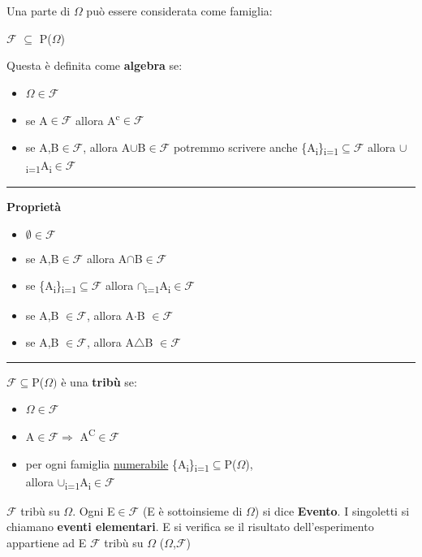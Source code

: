 \documentclass[12pt, a4paper]{article}
\def\SPSB#1#2{\rlap{\textsuperscript{#1}}\SB{#2}}
\def\SP#1{\textsuperscript{#1}}
\def\SB#1{\textsubscript{#1}}
\def\separator{\begin{center}    \rule{100pt}{0.5pt}\end{center}}
\begin{document}
Una parte di $\Omega$ può essere considerata come famiglia:
\begin{center}
    $\mathcal{F}$ $\subseteq$ P($\Omega$)
\end{center}
Questa è definita come \textbf{algebra} se:
\begin{itemize}
    \item $\Omega\in\mathcal{F}$
    \item se A$\in\mathcal{F}$ allora A\SP{c}$\in\mathcal{F}$
    \item se A,B$\in\mathcal{F}$, allora A$\cup$B$\in\mathcal{F}$
    \subitem potremmo scrivere anche \{A\SB{i}\}\SPSB{n}{i=1}$\subseteq\mathcal{F}$ allora 
    $\cup$\SPSB{n}{i=1}A\SB{i}$\in\mathcal{F}$
\end{itemize}

\separator

\large{\textbf{Proprietà}}\normalsize
\begin{itemize}
    \item $\emptyset\in\mathcal{F}$
    \item se A,B$\in\mathcal{F}$ allora A$\cap$B$\in\mathcal{F}$
    \item se \{A\SB{i}\}\SPSB{n}{i=1}$\subseteq\mathcal{F}$ allora $\cap$\SPSB{n}{i=1}A\SB{i}$\in\mathcal{F}$
    \item se A,B $\in\mathcal{F}$, allora A$\cdot$B $\in\mathcal{F}$
    \item se A,B $\in\mathcal{F}$, allora A$\triangle$B $\in\mathcal{F}$
\end{itemize}

\separator
 
$\mathcal{F}\subseteq$P($\Omega)$ è una \textbf{tribù} se:
\begin{itemize}
    \item $\Omega\in\mathcal{F}$ 
    \item A$\in\mathcal{F}\Rightarrow$ A\SP{C}$\in\mathcal{F}$
    \item per ogni famiglia \underline{numerabile} \{A\SB{i}\}\SPSB{+$\infty$}{i=1}$\subseteq$P($\Omega$),\\ allora 
    $\cup$\SPSB{+$\infty$}{i=1}A\SB{i}$\in\mathcal{F}$
\end{itemize}

$\mathcal{F}$ tribù su $\Omega$. Ogni E$\in\mathcal{F}$ (E è sottoinsieme di $\Omega$) si dice \textbf{Evento}.
I singoletti si chiamano \textbf{eventi elementari}. E si verifica se il risultato dell'esperimento appartiene ad E
$\mathcal{F}$ tribù su $\Omega$ ($\Omega$,$\mathcal{F}$)\\
\end{document}
